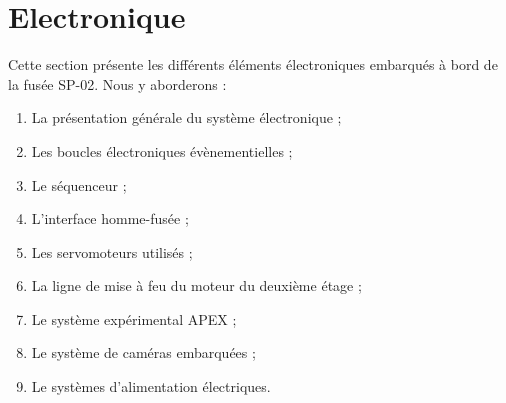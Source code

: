 \section{Electronique}
\label{sec:electronique}

Cette section présente les différents éléments électroniques embarqués à bord de la fusée SP-02. Nous y aborderons :
\begin{enumerate}
    \item La présentation générale du système électronique ;
    \item Les boucles électroniques évènementielles ;
    \item Le séquenceur ;
    \item L'interface homme-fusée ;
    \item Les servomoteurs utilisés ;
    \item La ligne de mise à feu du moteur du deuxième étage ;
    \item Le système expérimental APEX ;
    \item Le système de caméras embarquées ;
    \item Le systèmes d'alimentation électriques.
\end{enumerate}











\newpage
